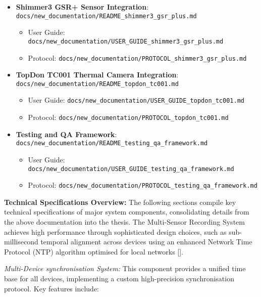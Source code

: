 \documentclass[11pt,a4paper]{report}
\begin{document}
{\begin{itemize}
\begin{itemize}
        \item Protocol: \texttt{docs/new\_documentation/PROTOCOL\_session\_management.md}
    \end{itemize}
    \item \textbf{Shimmer3 GSR+ Sensor Integration}: \texttt{docs/new\_documentation/README\_shimmer3\_gsr\_plus.md}
    \begin{itemize}
        \item User Guide: \texttt{docs/new\_documentation/USER\_GUIDE\_shimmer3\_gsr\_plus.md}
        \item Protocol: \texttt{docs/new\_documentation/PROTOCOL\_shimmer3\_gsr\_plus.md}
    \end{itemize}
    \item \textbf{TopDon TC001 Thermal Camera Integration}: \texttt{docs/new\_documentation/README\_topdon\_tc001.md}
    \begin{itemize}
        \item User Guide: \texttt{docs/new\_documentation/USER\_GUIDE\_topdon\_tc001.md}
        \item Protocol: \texttt{docs/new\_documentation/PROTOCOL\_topdon\_tc001.md}
    \end{itemize}
    \item \textbf{Testing and QA Framework}: \texttt{docs/new\_documentation/README\_testing\_qa\_framework.md}
    \begin{itemize}
        \item User Guide: \texttt{docs/new\_documentation/USER\_GUIDE\_testing\_qa\_framework.md}
        \item Protocol: \texttt{docs/new\_documentation/PROTOCOL\_testing\_qa\_framework.md}
    \end{itemize}
\end{itemize}

\noindent\textbf{Technical Specifications Overview:} The following sections compile key technical specifications of major system components, consolidating details from the above documentation into the thesis. The Multi-Sensor Recording System achieves high performance through sophisticated design choices, such as sub-millisecond temporal alignment across devices using an enhanced Network Time Protocol (NTP) algorithm optimised for local networks [\cite{mills1991ntp}].

\emph{Multi-Device synchronisation System:} This component provides a unified time base for all devices, implementing a custom high-precision synchronisation protocol. Key features include:

}
\end{document}
